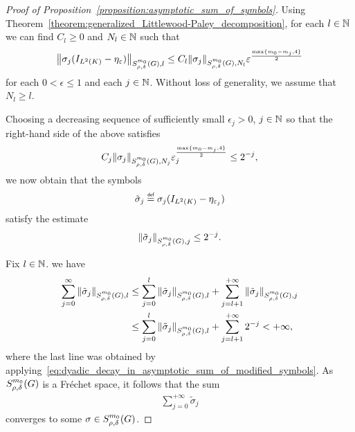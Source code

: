 \begin{proof}[Proof of Proposition~\ref{proposition:asymptotic_sum_of_symbols}]
    Using Theorem~\ref{theorem:generalized_Littlewood-Paley_decomposition},
    for each $l \in \N$ we can find $C_l \geq 0$ and $N_l \in \N$ such that
    \begin{align*}
        \SymbolSemiNorm {m_0} {\rho, \delta} l {\sigma_j (\Id {\Lebesgue 2 \CompactGroup} - \eta_\epsilon)}
        \leq C_l \SymbolSemiNorm {m_0} {\rho, \delta} {N_l} {\sigma_j}
        \epsilon^{\frac {\max\{m_0 - m_j, 4\}} 2}
    \end{align*}
    for each $0 < \epsilon \leq 1$ and each $j \in \N$.
    Without loss of generality,
    we assume that $N_l \geq l$.

    Choosing a decreasing sequence of sufficiently small $\epsilon_j > 0$, $j \in \N$
    so that the right-hand side of the above satisfies
    \begin{align*}
        C_j \SymbolSemiNorm {m_0} {\rho, \delta} {N_j} {\sigma_j} \epsilon_j^{\frac {\max \{m_0 - m_j, 4\}} 2}
        \leq 2^{-j},
    \end{align*}
    we now obtain that the symbols
    \begin{align*}
        \tilde \sigma_j \defeq \sigma_j (\Id {\Lebesgue 2 \CompactGroup} - \eta_{\epsilon_j})
    \end{align*}
    satisfy the estimate
    \begin{align}
        \SymbolSemiNorm {m_0} {\rho, \delta} j {\tilde \sigma_j}
        \leq 2^{-j}.
        \label{eq:dyadic_decay_in_asymptotic_sum_of_modified_symbols}
    \end{align}

    Fix $l \in \N$.
    we have
    \begin{align}
        \sum_{j = 0}^\infty \SymbolSemiNorm {m_0} {\rho, \delta} l {\tilde \sigma_j}
        &\leq \sum_{j = 0}^l \SymbolSemiNorm {m_0} {\rho, \delta} l {\tilde \sigma_j}
        + \sum_{j = l + 1}^{+\infty} \SymbolSemiNorm {m_0} {\rho, \delta} {j} {\tilde \sigma_j} \notag\\
        &\leq \sum_{j = 0}^l \SymbolSemiNorm {m_0} {\rho, \delta} l {\tilde \sigma_j}
        + \sum_{j = l + 1}^{+\infty} 2^{-j} < + \infty,
        \label{eq:convergence_of_asymptotic_sum_of_modified_symbols}
    \end{align}
    where the last line was obtained by applying~\eqref{eq:dyadic_decay_in_asymptotic_sum_of_modified_symbols}.
    As $\SymbolClass {m_0} {\rho, \delta}$ is a Fr\'echet space,
    it follows that the sum
    \begin{align*}
        \sum_{j = 0}^{+\infty} \tilde \sigma_j
    \end{align*}
    converges to some $\sigma \in \SymbolClass {m_0} {\rho, \delta}$.


\end{proof}

